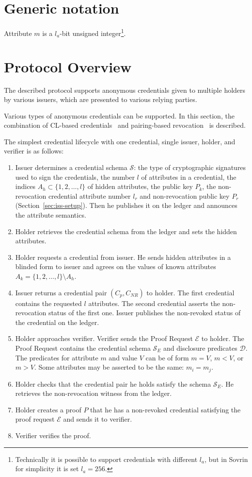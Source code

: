 \documentclass[a4paper]{article}
\begin{document}
\section{Generic notation}

Attribute $m$ is a $l_a$-bit unsigned integer\footnote{Technically it is possible to support credentials with different $l_a$, but in Sovrin for simplicity it is set $l_a=256$.}.


\section{Protocol Overview}

The described protocol supports anonymous credentials given to multiple holders  by various issuers, which are presented to various relying parties.

Various types of anonymous credentials can be supported. In this section, the combination of CL-based credentials~\cite{CamenischL02} and pairing-based revocation~\cite{CamenischKS09} is described.

The simplest credential lifecycle with one credential, single issuer, holder, and verifier is as follows:
\begin{enumerate}
    \item Issuer determines a credential schema $\mathcal{S} $: the type of cryptographic signatures used to sign the credentials, the number $l$ of attributes in a credential, the indices $A_h\subset \{1,2,\ldots,l\}$ of hidden attributes, the public key $P_k$, the non-revocation credential attribute number $l_r$ and non-revocation public key $P_r$ (Section~\ref{sec:iss-setup}). Then he publishes it on the ledger and announces the attribute semantics.
    \item Holder retrieves the credential schema from the ledger and sets the hidden attributes.
    \item Holder requests a credential from issuer. He sends hidden attributes in a blinded form to issuer and agrees on the values of known attributes $A_k=\{1,2,
\ldots,l\}\setminus A_h$.
    \item Issuer returns a credential pair $(C_p, C_{NR})$ to holder. The first credential contains the requested $l$ attributes. The second credential asserts the non-revocation status of the first one. Issuer publishes the non-revoked status of the credential on the ledger.
    \item Holder approaches verifier. Verifier sends the Proof Request $\mathcal{E}$
    to holder. The Proof Request contains the credential schema $\mathcal{S}_E$ and disclosure predicates $\mathcal{D}$. The predicates for attribute $m$ and value $V$ can be of form $m=V$, $m<V$, or $m>V$. Some attributes may be asserted to be the same: $m_i=m_j$.
    \item Holder checks that the credential pair he holds satisfy the schema $\mathcal{S}_E$.
    He retrieves the non-revocation witness from the ledger.
    \item Holder creates a proof $P$ that he has a non-revoked credential satisfying the proof request $\mathcal{E}$ and sends it to verifier.
    \item Verifier verifies the proof.
\end{enumerate}
\end{document}
